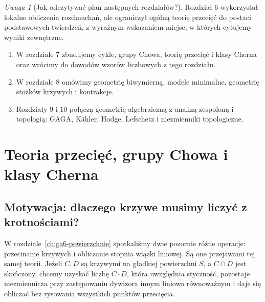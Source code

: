 \documentclass[11pt,a4paper,openany]{report}
\numberwithin{equation}{section}
\theoremstyle{plain}
\theoremstyle{definition}
\theoremstyle{remark}
\newtheorem{uwaga}[twierdzenie]{Uwaga}
\begin{document}
\begin{uwaga}[Jak odczytywać plan następnych rozdziałów?]
Rozdział 6 wykorzystał lokalne obliczenia rozdmuchań,
ale ograniczył ogólną teorię przecięć do postaci
podstawowych twierdzeń, z wyraźnym wskazaniem miejsc,
w których cytujemy wyniki zewnętrzne.
\begin{enumerate}[label=(\roman*)]
\item W rozdziale 7 zbudujemy cykle, grupy Chowa,
      teorię przecięć i klasy Cherna oraz wrócimy
      do dowodów wzorów liczbowych z tego rozdziału.
\item W rozdziale 8 omówimy geometrię biwymierną,
      modele minimalne, geometrię stożków krzywych
      i kontrakcje.
\item Rozdziały 9 i 10 połączą geometrię algebraiczną
      z analizą zespoloną i topologią: GAGA, Kähler,
      Hodge, Lefschetz i niezmienniki topologiczne.
\end{enumerate}
\end{uwaga}




\chapter{Teoria przecięć, grupy Chowa i klasy Cherna}
\label{ch:ga7-chow-chern}

\section{Motywacja: dlaczego krzywe musimy liczyć z krotnościami?}
\label{sec:ga7-motivation}

W rozdziale~\ref{ch:ga6-powierzchnie} spotkaliśmy dwie pozornie różne
operacje: przecinanie krzywych i obliczanie stopnia wiązki liniowej.
Są one przejawami tej samej teorii. Jeżeli $C,D$ są krzywymi na
gładkiej powierzchni $S$, a $C\cap D$ jest skończony, chcemy
uzyskać liczbę $C\cdot D$, która uwzględnia styczność,
pozostaje niezmiennicza przy zastępowaniu dywizora innym
liniowo równoważnym i daje się obliczać bez rysowania
wszystkich punktów przecięcia.
\end{document}
